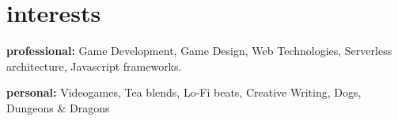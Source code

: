 \documentclass[]{cv-style}          %
\begin{document}

\section{interests}
  \vspace{-0.4cm}

\textbf{professional:} {Game Development, Game Design, Web Technologies, Serverless architecture, Javascript frameworks.} 

\textbf{personal:} {Videogames, Tea blends, Lo-Fi beats, Creative Writing, Dogs, Dungeons \& Dragons}

\end{document}
